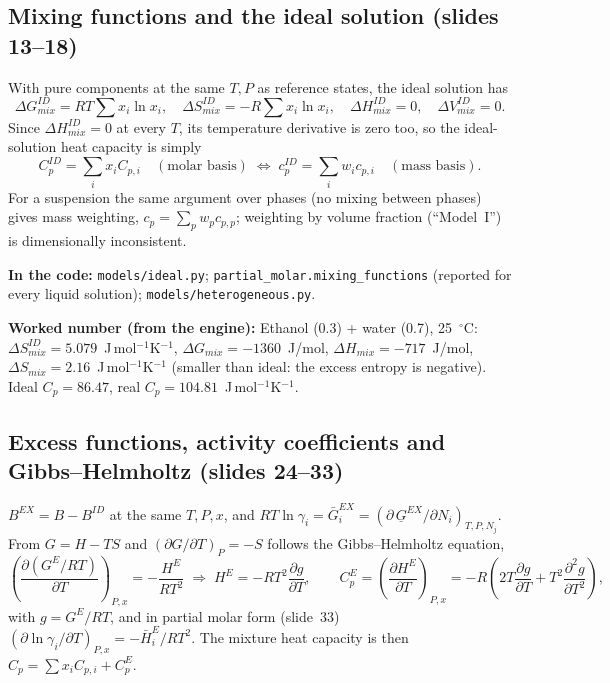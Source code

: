 \documentclass[11pt,a4paper]{article}
\newcommand{\code}[1]{\texttt{\small #1}}
\newcommand{\where}[1]{\par\noindent\textbf{In the code:} #1\par}
\newcommand{\num}[1]{\par\noindent\textbf{Worked number (from the engine):} #1\par}
\begin{document}
\subsection{Mixing functions and the ideal solution (slides 13--18)}
With pure components at the same $T,P$ as reference states, the ideal solution has
\[
\Delta G^{ID}_{mix}=RT\sum x_i\ln x_i,\quad \Delta S^{ID}_{mix}=-R\sum x_i\ln x_i,\quad
\Delta H^{ID}_{mix}=0,\quad \Delta V^{ID}_{mix}=0 .
\]
Since $\Delta H_{mix}^{ID}=0$ at every $T$, its temperature derivative is zero too, so the ideal-solution
heat capacity is simply
\[
C_p^{ID}=\sum_i x_iC_{p,i}\quad(\text{molar basis}) \;\Longleftrightarrow\; c_p^{ID}=\sum_i w_ic_{p,i}\quad(\text{mass basis}).
\]
For a suspension the same argument over phases (no mixing between phases) gives mass weighting,
$c_p=\sum_p w_pc_{p,p}$; weighting by volume fraction (``Model~I'') is dimensionally inconsistent.
\where{\code{models/ideal.py}; \code{partial\_molar.mixing\_functions} (reported for every liquid solution);
\code{models/heterogeneous.py}.}
\num{Ethanol (0.3) + water (0.7), 25~$^\circ$C: $\Delta S^{ID}_{mix}=5.079$~J\,mol$^{-1}$K$^{-1}$,
$\Delta G_{mix}=-1360$~J/mol, $\Delta H_{mix}=-717$~J/mol, $\Delta S_{mix}=2.16$~J\,mol$^{-1}$K$^{-1}$
(smaller than ideal: the excess entropy is negative). Ideal $C_p=86.47$, real $C_p=104.81$~J\,mol$^{-1}$K$^{-1}$.}

\subsection{Excess functions, activity coefficients and Gibbs--Helmholtz (slides 24--33)}
$B^{EX}=B-B^{ID}$ at the same $T,P,x$, and $RT\ln\gamma_i=\bar G_i^{EX}=(\partial\,\underline{G}^{EX}/\partial
N_i)_{T,P,N_j}$. From $G=H-TS$ and $(\partial G/\partial T)_P=-S$ follows the Gibbs--Helmholtz equation,
\[
\left(\frac{\partial (G^{E}/RT)}{\partial T}\right)_{P,x}=-\frac{H^{E}}{RT^2}
\;\Rightarrow\;
H^E=-RT^2\frac{\partial g}{\partial T},\qquad
C_p^E=\left(\frac{\partial H^E}{\partial T}\right)_{P,x}=-R\left(2T\frac{\partial g}{\partial T}+T^2\frac{\partial^2
g}{\partial T^2}\right),
\]
with $g=G^E/RT$, and in partial molar form (slide~33) $(\partial\ln\gamma_i/\partial T)_{P,x}=-\bar H_i^{E}/RT^2$.
The mixture heat capacity is then $C_p=\sum x_iC_{p,i}+C_p^E$.
\end{document}
